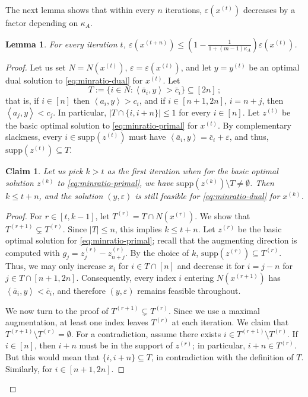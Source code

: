 \documentclass[11pt, a4paper]{article}
\newcommand{\pr}[2]{\left\langle #1, #2 \right\rangle}
\newcommand{\supp}{\mathrm{supp}}
\newcommand{\1}{\mathbbm{1}}
\newtheorem{lemma}[theorem]{Lemma}
\newtheorem{claim}{Claim}[theorem]
\theoremstyle{case}
\begin{document}
The next lemma shows that within every $n$ iterations, $\varepsilon(x^{(t)})$ decreases by a factor depending on $\kappa_A$.
\begin{lemma}\label{lem:weakly-poly} For every iteration $t$, $\varepsilon(x^{(t+n)})\le \left(1-\frac{1}{1+(m-1)\kappa_A}\right) \varepsilon(x^{(t)})$.
\end{lemma}
\begin{proof}
Let us set $N=N(x^{(t)})$, $\varepsilon=\varepsilon(x^{(t)})$, and let $y=y^{(t)}$ be an optimal dual solution to \eqref{eq:minratio-dual} for $x^{(t)}$.
 Let 
 \[
 T := \{i \in N: \pr{\bar a_i}{y} > \bar c_i \} \subseteq [2n]\, ;
 \]
  that is, if $i\in [n]$ then $\pr{a_i}{y}>c_i$, and if $i\in [n+1,2n]$, $i=n+j$, then  $\pr{a_j}{y}<c_j$.  In particular, $|T\cap\{i,i+n\}|\le 1$ for every $i\in [n]$.
 Let $z^{(t)}$ be the basic optimal solution to \eqref{eq:minratio-primal} for $x^{(t)}$.
By complementary slackness, every $i\in \supp(z^{(t)})$ must have   $\pr{\bar a_i}{y}=\bar c_i+\varepsilon$, and thus,
 $\supp(z^{(t)})\subseteq T$.

\begin{claim}
Let us pick $k>t$ as the first iteration when for the basic optimal solution  $z^{(k)}$ to \eqref{eq:minratio-primal}, we have $\supp(z^{(k)})\setminus T\neq \emptyset$.
Then $k\le t+n$, and 
the solution $(y,\varepsilon)$ is still feasible for \eqref{eq:minratio-dual} for $x^{(k)}$.
\end{claim}
\begin{proof}
For $r\in[t,k-1]$, 
let  $T^{(r)}=T\cap N(x^{(r)})$. We show that $T^{(r+1)}\subsetneq T^{(r)}$. Since $|T|\le n$, this implies $k\le t+n$.
Let $z^{(r)}$ be the basic optimal solution  for \eqref{eq:minratio-primal}; recall that the augmenting direction is computed with $g_j=z^{(r)}_j-z^{(r)}_{n+j}$. By the choice of $k$, $\supp(z^{(r)})\subseteq T^{(r)}$. Thus, 
 we may only increase $x_i$ for $i\in T\cap [n]$ and decrease it for $i=j-n$ for $j\in T\cap [n+1,2n]$. Consequently, every index $i$ entering $N(x^{(r+1)})$ has $\pr{\bar a_i}{y}<\bar c_i$, and therefore $(y,\varepsilon)$ remains feasible throughout.

We now turn to the proof of $T^{(r+1)}\subsetneq T^{(r)}$.
Since we use a maximal augmentation, at least one index leaves $T^{(r)}$ at each iteration. We claim that $T^{(r+1)}\setminus T^{(r)}=\emptyset$. For a contradiction, assume  there exists $i\in T^{(r+1)}\setminus T^{(r)}$. If $i\in [n]$, then
$i+n$ must be in the support of $z^{(r)}$; in particular, $i+n\in T^{(r)}$. But this would mean that $\{i,i+n\}\subseteq T$, in contradiction with the definition of $T$. Similarly, for $i\in [n+1,2n]$.
\end{proof}


\end{proof}
\end{document}
